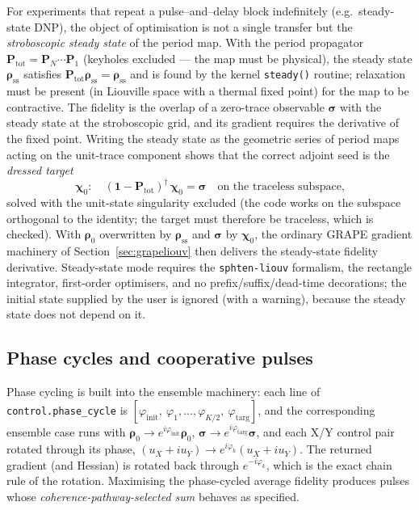 \documentclass[11pt,a4paper]{article}
\newcommand{\code}[1]{\texttt{#1}}
\begin{document}
For experiments that repeat a pulse--and--delay block indefinitely (e.g.\
steady-state DNP), the object of optimisation is not a single transfer
but the \emph{stroboscopic steady state} of the period map. With the
period propagator $\mathbf{P}_{\mathrm{tot}}=\mathbf{P}_N\cdots
\mathbf{P}_1$ (keyholes excluded --- the map must be physical), the
steady state $\boldsymbol{\rho}_{\mathrm{ss}}$ satisfies
$\mathbf{P}_{\mathrm{tot}}\boldsymbol{\rho}_{\mathrm{ss}}
=\boldsymbol{\rho}_{\mathrm{ss}}$ and is found by the kernel
\code{steady()} routine; relaxation must be present (in Liouville space
with a thermal fixed point) for the map to be contractive. The fidelity
is the overlap of a zero-trace observable $\boldsymbol{\sigma}$ with the
steady state at the stroboscopic grid, and its gradient requires the
derivative of the fixed point. Writing the steady state as the geometric
series of period maps acting on the unit-trace component shows that the
correct adjoint seed is the \emph{dressed target}
\begin{equation}
  \boldsymbol{\chi}_0:\quad
  (\mathbf{1}-\mathbf{P}_{\mathrm{tot}})^{\dagger}\,\boldsymbol{\chi}_0
  =\boldsymbol{\sigma}
  \quad\text{on the traceless subspace,}
\end{equation}
solved with the unit-state singularity excluded (the code works on the
subspace orthogonal to the identity; the target must therefore be
traceless, which is checked). With $\boldsymbol{\rho}_0$ overwritten by
$\boldsymbol{\rho}_{\mathrm{ss}}$ and $\boldsymbol{\sigma}$ by
$\boldsymbol{\chi}_0$, the ordinary GRAPE gradient machinery of
Section~\ref{sec:grapeliouv} then delivers the steady-state fidelity
derivative. Steady-state mode requires the \code{sphten-liouv} formalism,
the rectangle integrator, first-order optimisers, and no
prefix/suffix/dead-time decorations; the initial state supplied by the
user is ignored (with a warning), because the steady state does not
depend on it.

\subsection{Phase cycles and cooperative pulses}
\label{sec:phasecycle}

Phase cycling is built into the ensemble machinery: each line of
\code{control.phase\_cycle} is
$[\varphi_{\mathrm{init}},\ \varphi_1,\ldots,\varphi_{K/2},\
\varphi_{\mathrm{targ}}]$, and the corresponding ensemble case runs with
$\boldsymbol{\rho}_0\to e^{i\varphi_{\mathrm{init}}}\boldsymbol{\rho}_0$,
$\boldsymbol{\sigma}\to e^{i\varphi_{\mathrm{targ}}}\boldsymbol{\sigma}$,
and each X/Y control pair rotated through its phase,
$(u_X+iu_Y)\to e^{i\varphi_k}(u_X+iu_Y)$. The returned gradient (and
Hessian) is rotated back through $e^{-i\varphi_k}$, which is the exact
chain rule of the rotation. Maximising the phase-cycled average fidelity
produces pulses whose \emph{coherence-pathway-selected sum} behaves as
specified.
\end{document}

